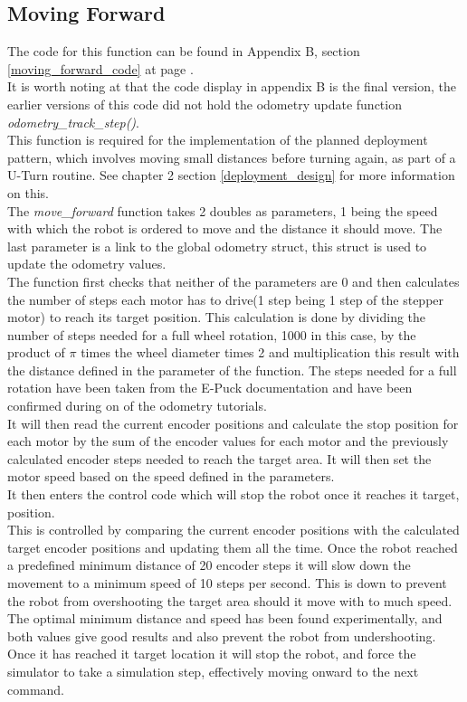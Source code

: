\subsection{Moving Forward}
\label{moving_forward_description}
The code for this function can be found in Appendix B, section \ref{moving_forward_code} at page \pageref{moving_forward_code}.\\
It is worth noting at that the code display in appendix B is the final version, the earlier versions of this code did not hold the odometry update function \textit{odometry\_track\_step()}.\\
This function is required for the implementation of the planned deployment pattern, which involves moving small distances before turning again, as part of a U-Turn routine. See chapter 2 section \ref{deployment_design} for more information on this.\\
The \textit{move\_forward }function takes 2 doubles as parameters, 1 being the speed with which the robot is ordered to move and the distance it should move. The last parameter is a link to the global odometry struct, this struct is used to update the odometry values.\\
The function first checks that neither of the parameters are 0 and then calculates the number of steps each motor has to drive(1 step being 1 step of the stepper motor) to reach its target position.
This calculation is done by dividing the number of steps needed for a full wheel rotation, 1000 in this case, by the product of $\pi$ times the wheel diameter times 2 and multiplication this result with the distance defined in the parameter of the function. The steps needed for a full rotation have been taken from the E-Puck documentation and have been confirmed during on of the odometry tutorials. \\
It will then read the current encoder positions and calculate the stop position for each motor by the sum of the encoder values for each motor and the previously calculated encoder steps needed to reach the target area.
It will then set the motor speed based on the speed defined in the parameters.\\[3ex]

It then enters the control code which will stop the robot once it reaches it target, position. \\
This is controlled by comparing the current encoder positions with the calculated target encoder positions and updating them all the time.
Once the robot reached a predefined minimum distance of 20 encoder steps it will slow down the movement to a minimum speed of 10 steps per second. This is down to prevent the robot from overshooting the target area should it move with to much speed. The optimal minimum distance and speed has been found experimentally, and both values give good results and also prevent the robot from undershooting.
Once it has reached it target location it will stop the robot, and force the simulator to take a simulation step, effectively moving onward to the next command.\\[3ex]


